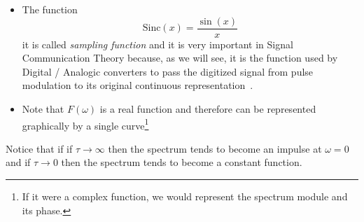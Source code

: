 \begin{itemize}
\item [] The function
  \begin{equation*}
    \mathrm{Sinc}(x) = \frac{\sin(x)}{x}
  \end{equation*}
  it is called \emph{sampling function} and it is very important in
  Signal Communication Theory because, as we will see, it is the
  function used by Digital / Analogic converters to pass the digitized
  signal from pulse modulation to its original continuous
  representation~\cite{Lathi}.
  
\item [] Note that $F(\omega)$ is a real function and therefore can be represented graphically by a single curve\footnote{If it were a complex function, we would represent the spectrum module and its phase.}
  
\end{itemize}


\noindent Notice that if if $\tau\rightarrow \infty$ then the spectrum
tends to become an impulse at $\omega=0$ and if $\tau\rightarrow 0$
then the spectrum tends to become a constant function.

